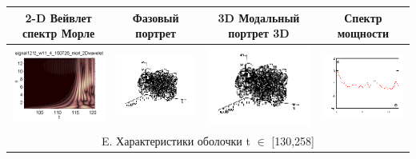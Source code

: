 \documentclass[12pt,letterpaper]{extreport}
\begin{document}
\begin{table}[H]
{\begin{tabular}{|c|c|c|c|}
\hline
\footnotesize 2-D Вейвлет спектр Морле&\footnotesize Фазовый портрет&\footnotesize 3D	Модальный портрет 3D&\footnotesize Спектр мощности\\
\hline
	\includegraphics[scale=1]{d1} 	
	&	
	\includegraphics[scale=0.9]{d2} 	
	&	
	\includegraphics[scale=0.9]{d3} 
	&
	\includegraphics[scale=0.9]{d4} 
\\
\hline

\multicolumn{4}{|c|}{E. Характеристики оболочки  t $\in$ [130,258]}\\


\end{tabular}}
\end{table}
\end{document}
